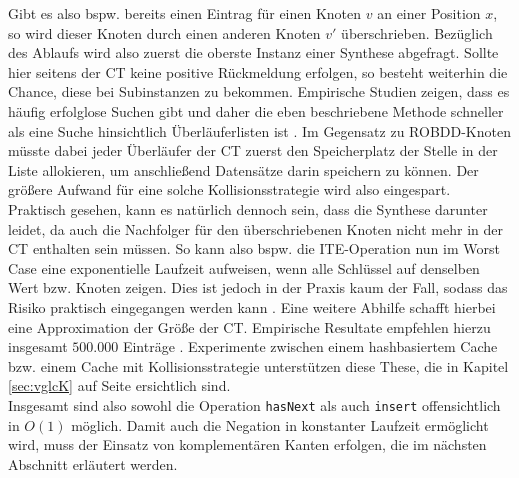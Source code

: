 Gibt es also bspw. bereits einen Eintrag für einen Knoten $v$ an einer Position $x$, so wird dieser Knoten durch einen anderen Knoten $v'$ überschrieben. Bezüglich des Ablaufs wird also zuerst die oberste Instanz einer Synthese abgefragt. Sollte hier seitens der CT keine positive Rückmeldung erfolgen, so besteht weiterhin die Chance, diese bei Subinstanzen zu bekommen. Empirische Studien zeigen, dass es häufig erfolglose Suchen gibt und daher die eben beschriebene Methode schneller als eine Suche hinsichtlich Überläuferlisten ist \cite[S.86]{h2002}. Im Gegensatz zu ROBDD-Knoten müsste dabei jeder Überläufer der CT zuerst den Speicherplatz der Stelle in der Liste allokieren, um anschließend Datensätze darin speichern zu können. Der größere Aufwand für eine solche Kollisionsstrategie wird also eingespart. Praktisch gesehen, kann es natürlich dennoch sein, dass die Synthese darunter leidet, da auch die Nachfolger für den überschriebenen Knoten nicht mehr in der CT enthalten sein müssen. So kann also bspw. die ITE-Operation nun im Worst Case eine exponentielle Laufzeit aufweisen, wenn alle Schlüssel auf denselben Wert bzw. Knoten zeigen. Dies ist jedoch in der Praxis kaum der Fall, sodass das Risiko praktisch eingegangen werden kann \cite{j2001}. Eine weitere Abhilfe schafft hierbei eine Approximation der Größe der CT. Empirische Resultate empfehlen hierzu insgesamt $500.000$ Einträge \cite[S.88]{h2002}. Experimente zwischen einem hashbasiertem Cache bzw. einem Cache mit Kollisionsstrategie unterstützen diese These, die in Kapitel \ref{sec:vglcK} auf Seite \pageref{sec:vglcK} ersichtlich sind.\\
Insgesamt sind also sowohl die Operation \texttt{hasNext} als auch \texttt{insert} offensichtlich in $O(1)$ möglich. Damit auch die Negation in konstanter Laufzeit ermöglicht wird, muss der Einsatz von komplementären Kanten erfolgen, die im nächsten Abschnitt erläutert werden.
